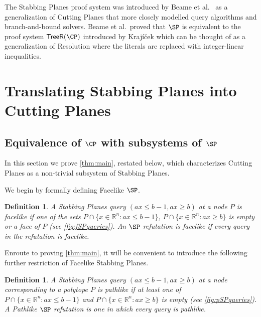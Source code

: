 \documentclass[11pt]{article}
\newtheorem{definition}[theorem]{Definition}
\begin{document}
The Stabbing Planes proof system was introduced by Beame et al.~\cite{BeameFIKPPR18} as a generalization of Cutting Planes that more closely modelled query algorithms and branch-and-bound solvers.
Beame et al.~proved that $\SP$ is equivalent to the proof system $\mathsf{TreeR}(\CP)$ introduced by Kraj\'{i}\v{c}ek \cite{Krajicek98} which can be thought of as a generalization of Resolution where the literals are replaced with integer-linear inequalities.






\section{Translating Stabbing Planes into Cutting Planes} 
\label{sec:SP}

\subsection{Equivalence of \texorpdfstring{$\CP$}{CP} with subsystems of
  \texorpdfstring{$\SP$}{SP}}
\label{sec:facelikesp-sim}

In this section we prove \autoref{thm:main}, restated below, which characterizes Cutting Planes as a non-trivial subsystem of Stabbing Planes.

\main*

We begin by formally defining Facelike $\SP$.
\begin{definition}
	A Stabbing Planes query $(ax \leq b-1, ax \geq b)$ at a node $P$ is \emph{facelike} if one of the sets $P \cap \{x \in \mathbb{R}^n: ax \leq b-1\}$, $P \cap \{x \in \mathbb{R}^n: ax \geq b\}$ is empty or a face of $P$ (see \autoref{fig:fSPqueries}).
	An $\SP$ refutation is facelike if every query in the refutation is facelike. 
\end{definition}

Enroute to proving \autoref{thm:main}, it will be convenient to introduce the following further restriction of Facelike Stabbing Planes.

\begin{definition}
	A Stabbing Planes query $(ax \leq b-1, ax \geq b)$ at a node corresponding to a polytope $P$ is \emph{pathlike} if at least one of $P \cap \{x \in \mathbb{R}^n: ax \leq b-1\}$ and $P \cap \{x \in \mathbb{R}^n: ax \geq b\}$ is empty (see \autoref{fig:pSPqueries}). A Pathlike $\SP$ refutation is one in which every query is pathlike. 
\end{definition}
\end{document}
